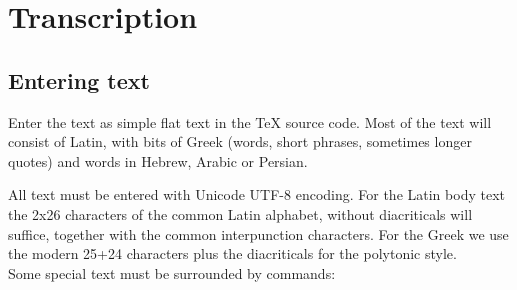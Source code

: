 \documentclass{report}
\begin{document}
\chapter{Transcription}

\section{Entering text}

Enter the text as simple flat text in the \TeX{} source code.
Most of the text will consist of Latin,
with bits of Greek (words, short phrases, sometimes longer quotes) and words
in Hebrew, Arabic or Persian.

All text must be entered with Unicode UTF-8 encoding.
For the Latin body text the 2x26 characters of the common Latin alphabet,
without diacriticals will suffice, together with the common interpunction
characters.
For the Greek we use the modern 25+24 characters plus the diacriticals
for the polytonic style.
\\
Some special text must be surrounded by commands:
\end{document}
